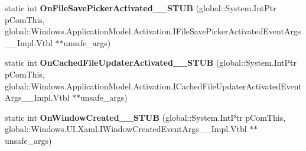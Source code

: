 \begin{DoxyCompactItemize}
\item 
\mbox{\label{struct_windows_1_1_u_i_1_1_xaml_1_1_i_application_overrides_____impl_1_1_vtbl_a69f9ef1a1651ef58133a816b423a9270}} 
static int {\bfseries On\+File\+Save\+Picker\+Activated\+\_\+\+\_\+\+S\+T\+UB} (global\+::\+System.\+Int\+Ptr p\+Com\+This, global\+::\+Windows.\+Application\+Model.\+Activation.\+I\+File\+Save\+Picker\+Activated\+Event\+Args\+\_\+\+\_\+\+Impl.\+Vtbl $\ast$$\ast$unsafe\+\_\+args)
\item 
\mbox{\label{struct_windows_1_1_u_i_1_1_xaml_1_1_i_application_overrides_____impl_1_1_vtbl_a621778ff6817d2ea373e2f5a1f42bd9b}} 
static int {\bfseries On\+Cached\+File\+Updater\+Activated\+\_\+\+\_\+\+S\+T\+UB} (global\+::\+System.\+Int\+Ptr p\+Com\+This, global\+::\+Windows.\+Application\+Model.\+Activation.\+I\+Cached\+File\+Updater\+Activated\+Event\+Args\+\_\+\+\_\+\+Impl.\+Vtbl $\ast$$\ast$unsafe\+\_\+args)
\item 
\mbox{\label{struct_windows_1_1_u_i_1_1_xaml_1_1_i_application_overrides_____impl_1_1_vtbl_a9afed578176233dce858655f137f848e}} 
static int {\bfseries On\+Window\+Created\+\_\+\+\_\+\+S\+T\+UB} (global\+::\+System.\+Int\+Ptr p\+Com\+This, global\+::\+Windows.\+U\+I.\+Xaml.\+I\+Window\+Created\+Event\+Args\+\_\+\+\_\+\+Impl.\+Vtbl $\ast$$\ast$unsafe\+\_\+args)
\end{DoxyCompactItemize}
